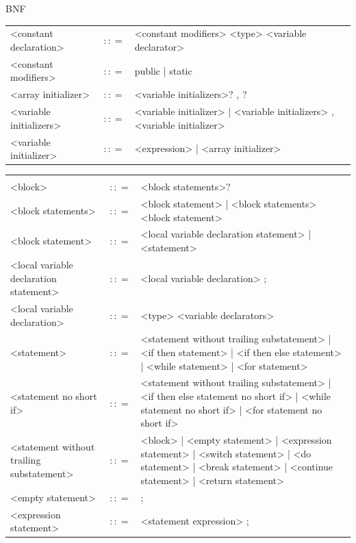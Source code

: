 \documentclass[landscape, 11pt]{article}
\begin{document}
\begin{qsection}{BNF}
\begin{enumerate}[label=\bt{\theenumi.}]
\begin{longtable}{R{7cm} c L{15cm}}
				\\
				<constant declaration>						&	$\colon\colon=$	&	<constant modifiers> <type> <variable declarator>
				\\
				<constant modifiers>						&	$\colon\colon=$	&	public | static
				\\
				<array initializer>							&	$\colon\colon=$	&	{ <variable initializers>? , ? }
				\\
				<variable initializers>						&	$\colon\colon=$	&	<variable initializer> | <variable initializers> , <variable initializer>
				\\
				<variable initializer>						&	$\colon\colon=$	&	<expression> | <array initializer>
			\end{longtable}

		\ditem[Types.]

			\begin{longtable}{R{7cm} c L{15cm}}
													&					&	 \\
				<block>										&	$\colon\colon=$	&	{ <block statements>? }
				\\
				<block statements>							&	$\colon\colon=$	&	<block statement> | <block statements> <block statement>
				\\
				<block statement>							&	$\colon\colon=$	&	<local variable declaration statement> | <statement>
				\\
				<local variable declaration statement>		&	$\colon\colon=$	&	<local variable declaration> ;
				\\
				<local variable declaration>				&	$\colon\colon=$	&	<type> <variable declarators>
				\\
				<statement>									&	$\colon\colon=$	&	<statement without trailing substatement> | <if then statement> | <if then else statement> | <while statement> | <for statement>
				\\
				<statement no short if>						&	$\colon\colon=$	&	<statement without trailing substatement> | <if then else statement no short if> | <while statement no short if> | <for statement no short if>
				\\
				<statement without trailing substatement>	&	$\colon\colon=$	&	<block> | <empty statement> | <expression statement> | <switch statement> | <do statement> | <break statement> | <continue statement> | <return statement>
				\\
				<empty statement>							&	$\colon\colon=$	&	;
				\\
				<expression statement>						&	$\colon\colon=$	&	<statement expression> ;

\end{longtable}
\end{enumerate}
\end{qsection}
\end{document}
